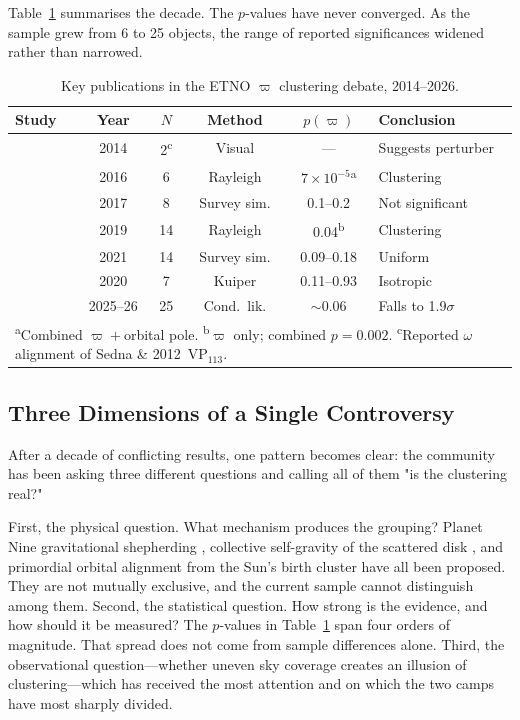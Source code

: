\documentclass[usenatbib]{mnras}
\begin{document}
Table~\ref{tab:timeline} summarises the decade. The $p$-values have never converged. As the sample grew from 6 to 25 objects, the range of reported significances widened rather than narrowed.

\begin{table}[htbp]
\centering
\caption{Key publications in the ETNO $\varpi$ clustering debate, 2014--2026.}
\label{tab:timeline}
\footnotesize
\begin{tabular}{p{2.8cm}ccccp{2.8cm}}
\hline
Study & Year & $N$ & Method & $p(\varpi)$ & Conclusion \\
\hline
\citet{trujillo2014} & 2014 & 2\textsuperscript{c} & Visual & --- & Suggests perturber \\
\citet{batygin2016} & 2016 & 6 & Rayleigh & $7{\times}10^{-5}$\textsuperscript{a} & Clustering \\
\citet{shankman2017} & 2017 & 8 & Survey sim. & 0.1--0.2 & Not significant \\
\citet{brown2019} & 2019 & 14 & Rayleigh & 0.04\textsuperscript{b} & Clustering \\
\citet{napier2021} & 2021 & 14 & Survey sim. & 0.09--0.18 & Uniform \\
\citet{bernardinelli2020} & 2020 & 7 & Kuiper & 0.11--0.93 & Isotropic \\
\citet{siraj2025,siraj2026} & 2025--26 & 25 & Cond.\ lik. & $\sim$0.06 & Falls to 1.9$\sigma$ \\
\hline
\multicolumn{6}{l}{\footnotesize\textsuperscript{a}Combined $\varpi{+}$orbital pole. \textsuperscript{b}$\varpi$ only; combined $p{=}0.002$. \textsuperscript{c}Reported $\omega$ alignment of Sedna \& 2012~VP$_{113}$.} \\
\end{tabular}
\end{table}

\subsection{Three Dimensions of a Single Controversy}

After a decade of conflicting results, one pattern becomes clear: the community has been asking three different questions and calling all of them "is the clustering real?"

First, the physical question. What mechanism produces the grouping? Planet Nine gravitational shepherding \citep{batygin2016,brown2019}, collective self-gravity of the scattered disk \citep{madigan2018,zderic2020}, and primordial orbital alignment from the Sun's birth cluster \citep{trujillo2014} have all been proposed. They are not mutually exclusive, and the current sample cannot distinguish among them. Second, the statistical question. How strong is the evidence, and how should it be measured? The $p$-values in Table~\ref{tab:timeline} span four orders of magnitude. That spread does not come from sample differences alone. Third, the observational question---whether uneven sky coverage creates an illusion of clustering---which has received the most attention and on which the two camps have most sharply divided.
\end{document}
